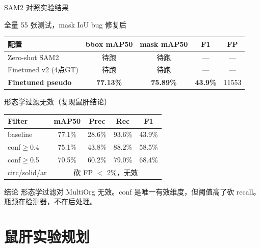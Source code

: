 \documentclass[aspectratio=169, 10pt]{beamer}
\begin{document}
\begin{frame}{SAM2 对照实验结果}
  \begin{block}{全量 55 张测试，mask IoU bug 修复后}
    \begin{tabular}{lcccc}
      \toprule
      \textbf{配置} & \textbf{bbox mAP50} & \textbf{mask mAP50} & \textbf{F1} & \textbf{FP} \\
      \midrule
      Zero-shot SAM2 & 待跑 & 待跑 & — & — \\
      Finetuned v2 (4点GT) & 待跑 & 待跑 & — & — \\
      \textbf{Finetuned pseudo} & \textbf{77.13\%} & \textbf{75.89\%} & \textbf{43.9\%} & 11553 \\
      \bottomrule
    \end{tabular}
  \end{block}
  \vspace{0em}
  \begin{block}{形态学过滤无效（复现鼠肝结论）}
    \begin{tabular}{lcccc}
      \toprule
      Filter & mAP50 & Prec & Rec & F1 \\
      \midrule
      baseline & 77.1\% & 28.6\% & 93.6\% & 43.9\% \\
      conf$\geq$0.4 & 75.1\% & 43.8\% & 88.2\% & 58.5\% \\
      conf$\geq$0.5 & 70.5\% & 60.2\% & 79.0\% & 68.4\% \\
      circ/solid/ar & \multicolumn{4}{c}{砍 FP $<$ 2\%，无效} \\
      \bottomrule
    \end{tabular}
  \end{block}
  \vspace{0em}
  \begin{alertblock}{结论}
    形态学过滤对 MultiOrg 无效。conf 是唯一有效维度，但阈值高了砍 recall。瓶颈在检测器，不在后处理。
  \end{alertblock}
\end{frame}

\section{鼠肝实验规划}
\end{document}
